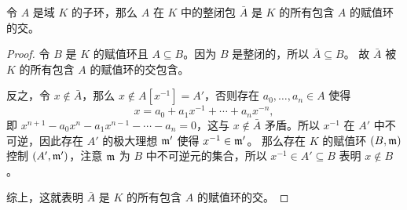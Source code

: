 \begin{corollary}\label{coro:integral closure is intersection of valuation ring}
  令 $A$ 是域 $K$ 的子环，那么 $A$ 在 $K$ 中的整闭包 $\bar A$ 是 $K$ 的所有包含 $A$
  的赋值环的交。
\end{corollary}
\begin{proof}
  令 $B$ 是 $K$ 的赋值环且 $A\subseteq B$。因为 $B$ 是整闭的，所以 $\bar A\subseteq B$。
  故 $\bar A$ 被 $K$ 的所有包含 $A$ 的赋值环的交包含。

  反之，令 $x\notin\bar A$，那么 $x\notin A[x^{-1}]=A'$，否则存在 $a_0,\dots,a_n\in A$
  使得
  \[
    x=a_0+ a_1x^{-1}+\cdots+a_nx^{-n},
  \]
  即 $x^{n+1}-a_0x^n-a_1x^{n-1}-\cdots-a_n=0$，这与 $x\notin\bar A$ 矛盾。所以 $x^{-1}$
  在 $A'$ 中不可逆，因此存在 $A'$ 的极大理想 $\mathfrak{m}'$ 使得 $x^{-1}\in\mathfrak{m}'$。
  那么存在 $K$ 的赋值环 $(B,\mathfrak{m})$ 控制 $(A',\mathfrak{m}')$，注意 $\mathfrak{m}$ 为 $B$
  中不可逆元的集合，所以 $x^{-1}\in A'\subseteq B$ 表明 $x\notin B$。
  
  综上，这就表明 $\bar A$ 是 $K$ 的所有包含 $A$ 的赋值环的交。
\end{proof}

